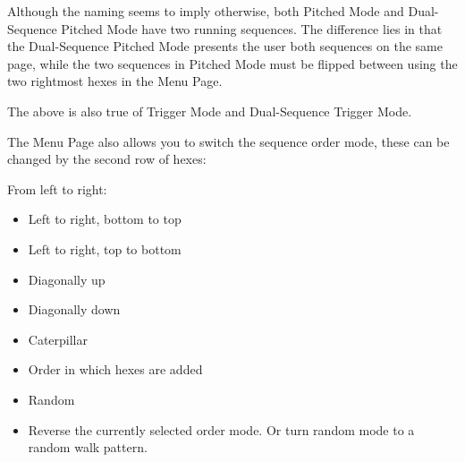   Although the naming seems to imply otherwise, both Pitched Mode and
  Dual-Sequence Pitched Mode have two running sequences. The difference
  lies in that the Dual-Sequence Pitched Mode presents the user both
  sequences on the same page, while the two sequences in Pitched Mode must
  be flipped between using the two rightmost hexes in the Menu Page.

  The above is also true of Trigger Mode and Dual-Sequence Trigger Mode.

  The Menu Page also allows you to switch the sequence order mode,
  these can be changed by the second row of hexes:

  From left to right:
  \begin{itemize}
    \item Left to right, bottom to top
    \item Left to right, top to bottom
    \item Diagonally up
    \item Diagonally down
    \item Caterpillar
    \item Order in which hexes are added
    \item Random
    \item Reverse the currently selected order mode. Or turn random mode to
    a random walk pattern.
  \end{itemize}


